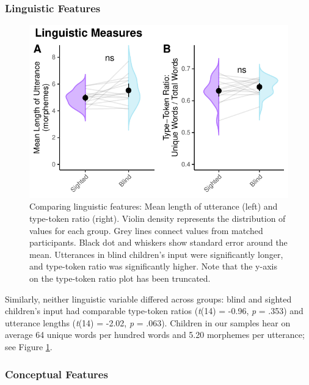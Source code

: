 \documentclass[
  man,floatsintext]{apa6}
\begin{document}
\hypertarget{linguistic-features-1}{%
\subsubsection{Linguistic Features}\label{linguistic-features-1}}

\begin{figure}
\includegraphics{input_quality_manuscript_files/figure-latex/linguistic-plots-1} \caption{Comparing linguistic features: Mean length of utterance (left) and type-token ratio (right). Violin density represents the distribution of values for each group. Grey lines connect values from matched participants. Black dot and whiskers show standard error around the mean. Utterances in blind children's input were significantly longer, and type-token ratio was significantly higher. Note that the y-axis on the type-token ratio plot has been truncated.}\label{fig:linguistic-plots}
\end{figure}

Similarly, neither linguistic variable differed across groups: blind and sighted children's input had comparable type-token ratios (\emph{t}(14) = -0.96, \emph{p} = .353) and utterance lengths (\emph{t}(14) = -2.02, \emph{p} = .063). Children in our samples hear on average 64 unique words per hundred words and 5.20 morphemes per utterance; see Figure \ref{fig:linguistic-plots}.

\hypertarget{conceptual-features-1}{%
\subsubsection{Conceptual Features}\label{conceptual-features-1}}
\end{document}
